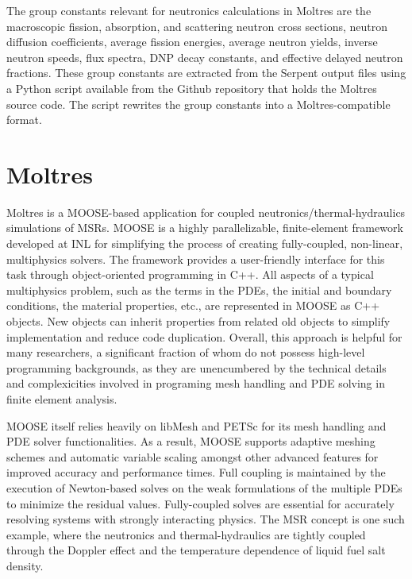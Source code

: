 The group constants relevant for neutronics calculations in Moltres are the
macroscopic fission, absorption, and scattering neutron cross sections,
neutron diffusion coefficients, average fission energies, average neutron
yields, inverse neutron speeds, flux spectra, \gls{DNP} decay constants, and
effective delayed neutron fractions. These group constants are extracted from
the Serpent output files using a Python script available from the Github
repository that holds the Moltres source code. The script rewrites the group
constants into a Moltres-compatible format.

\section{Moltres}

Moltres is a \gls{MOOSE}-based application for coupled
neutronics/thermal-hydraulics simulations of \glspl{MSR}. \gls{MOOSE}
\cite{gaston_physics-based_2015} is a highly parallelizable,
finite-element framework developed at \gls{INL} for simplifying the process of
creating fully-coupled, non-linear, multiphysics solvers. The framework
provides a user-friendly interface for this task through object-oriented
programming in C++. All aspects of a typical multiphysics problem, such as the
terms in the \glspl{PDE}, the initial and boundary conditions, the material
properties, etc., are represented in \gls{MOOSE} as C++ objects. New objects
can inherit properties from related old objects to simplify implementation and
reduce code duplication. Overall, this approach
is helpful for many researchers, a significant fraction of whom do not possess
high-level programming backgrounds, as they are unencumbered by the
technical details and complexicities involved in programing mesh handling
and \gls{PDE} solving in finite element analysis.

\gls{MOOSE} itself relies heavily on libMesh \cite{kirk_libmesh:_2006} and
PETSc \cite{satish_petsc_2019} for its mesh handling and \gls{PDE} solver
functionalities. As a result, \gls{MOOSE} supports adaptive meshing schemes
and automatic variable scaling amongst other advanced features for improved
accuracy and performance times. Full
coupling is maintained by the execution of Newton-based solves on the
weak formulations of the multiple \glspl{PDE} to minimize the residual values.
Fully-coupled solves are essential for accurately resolving systems with
strongly interacting physics. The \gls{MSR} concept is one such example, where
the neutronics and thermal-hydraulics are tightly coupled through the Doppler
effect and the temperature dependence of liquid fuel salt density.

